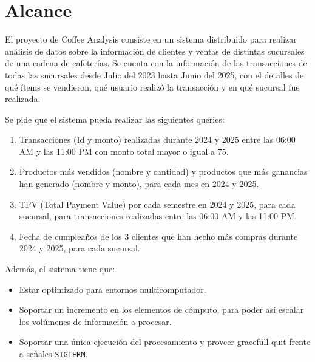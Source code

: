 \section{Alcance}
El proyecto de Coffee Analysis consiste en un sistema distribuido para realizar análisis de datos sobre la información de clientes y ventas de distintas sucursales de una cadena de cafeterías. Se cuenta con la información de las transacciones de todas las sucursales desde Julio del 2023 hasta Junio del 2025, con el detalles de qué ítems se vendieron, qué usuario realizó la transacción y en qué sucursal fue realizada.

Se pide que el sistema pueda realizar las siguientes queries:
\begin{enumerate}
    \item Transacciones (Id y monto) realizadas durante 2024 y 2025 entre las 06:00 AM y las 11:00 PM con monto total mayor o igual a 75. \label{item:query1}
    \item Productos más vendidos (nombre y cantidad) y productos que más ganancias han generado (nombre y monto), para cada mes en 2024 y 2025. \label{item:query2}
    \item TPV (Total Payment Value) por cada semestre en 2024 y 2025, para cada sucursal, para transacciones realizadas entre las 06:00 AM y las 11:00 PM. \label{item:query3}
    \item Fecha de cumpleaños de los 3 clientes que han hecho más compras durante 2024 y 2025, para cada sucursal. \label{item:query4}
\end{enumerate}

Además, el sistema tiene que:
\begin{itemize}
    \item Estar optimizado para entornos multicomputador.
    \item Soportar un incremento en los elementos de cómputo, para poder así escalar los volúmenes de información a procesar.
    \item Soportar una única ejecución del procesamiento y proveer gracefull quit frente a señales \texttt{SIGTERM}.
\end{itemize}
